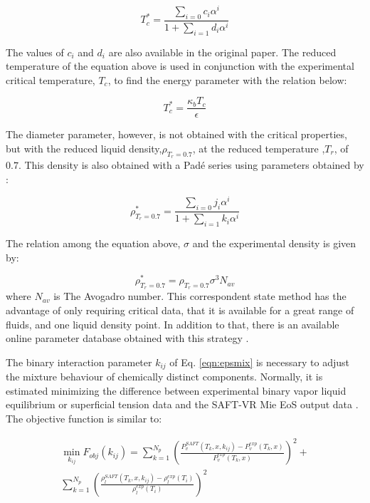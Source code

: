 \begin{equation}
T_{c}^{*} = \frac{\sum_{i=0} c_{i}\alpha^{i}}{1+\sum_{i=1} d_{i}\alpha^{i}}   
\label{eqn:tc}
\end{equation}

The values of $c_{i}$ and $d_{i}$ are also available in the original paper. The reduced temperature of the equation above is used in conjunction with the experimental critical temperature, $ T_{c}$, to find the energy parameter with the relation below:

\begin{equation}
T_{c}^{*} = \frac{\kappa_{b}T_{c}}{\epsilon}   
\label{eqn:epscorre}
\end{equation}

The diameter parameter, however, is not obtained with the critical properties, but with the reduced liquid density,$\rho_{T_{r}=0.7}$, at the reduced temperature ,$T_{r}$, of $0.7$. This density is also obtained with a Padé series using parameters obtained by :

\begin{equation}
\rho_{T_{r}=0.7}^{*} = \frac{\sum_{i=0} j_{i}\alpha^{i}}{1+\sum_{i=1} k_{i}\alpha^{i}} 
\label{eqn:denscorre}
\end{equation}

The relation among the equation above, $\sigma$ and the experimental density is given by:

\begin{equation}
\rho_{T_{r}=0.7}^{*} = \rho_{T_{r}=0.7}\sigma^{3}N_{av}   
\label{eqn:sigmacorre}
\end{equation}
where $N_{av}$ is The Avogadro number. This correspondent state method has the advantage of only requiring critical data, that it is available for a great range of fluids, and one liquid density point. In addition to that, there is an available online parameter database obtained with this strategy \cite{ervik2016}.     

The binary interaction parameter $k_{ij}$ of Eq. \eqref{eqn:epsmix} is necessary to adjust the mixture behaviour of chemically distinct components. Normally, it is estimated minimizing the difference between experimental binary vapor liquid equilibrium or superficial tension data and the SAFT-VR Mie EoS output data \cite{muller2017,lobanova2016}. The objective function is similar to: 

\begin{equation}
\begin{aligned}
\min\limits_{k_{ij}} F_{obj}(k_{ij})= \sum_{k=1}^{N_{p}} \left(\frac{P_{v}^{SAFT}(T_{k},x,k_{ij})-P_{v}^{exp}(T_{k},x)}{P_{v}^{exp}(T_{k},x)} \right)^2 +\\
 \sum_{k=1}^{N_{p}} \left(\frac{\rho_{l}^{SAFT}(T_{k},x,k_{ij})-\rho_{l}^{exp}(T_{i})}{\rho_{l}^{exp}(T_{i})} \right)^2
\end{aligned}
\label{eqn:fobjmix}
\end{equation}

